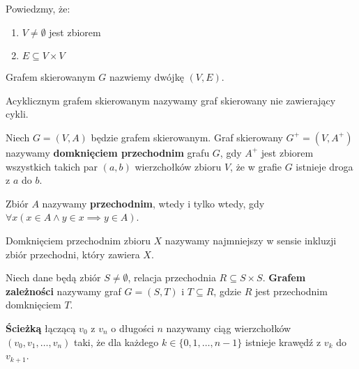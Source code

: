 \begin{definicja}\label{def:DG}
Powiedzmy, że:
\begin{enumerate}
\item \(V\neq\emptyset\) jest zbiorem
\item \( E \subseteq V \times V \)
\end{enumerate}
Grafem skierowanym \(G\) nazwiemy dwójkę \((V, E)\).
\end{definicja}

\begin{definicja}\label{def:dag}
Acyklicznym grafem skierowanym nazywamy graf skierowany nie zawierający cykli.
\end{definicja}

\begin{definicja}\label{def:domk_przechodnie_grafu}
Niech \(G=(V,A)\) będzie grafem skierowanym. Graf skierowany \(G^+=(V,A^{+})\) nazywamy \textbf{domknięciem przechodnim} grafu \(G\), gdy \(A^{+}\) jest zbiorem wszystkich takich par \((a,b)\) wierzchołków zbioru \(V\), że w grafie \(G\) istnieje droga z \(a\) do \(b\).
\end{definicja}

\begin{definicja}\label{def:transitive_set}
Zbiór \(A\) nazywamy \textbf{przechodnim}, wtedy i tylko wtedy, gdy
\(\forall{x}\left(x\in A \land y\in x\implies y\in A\right)\).  
\end{definicja}

\begin{definicja}\label{def:transitive_closure_set}
Domknięciem przechodnim zbioru \(X\) nazywamy najmniejszy w sensie inkluzji zbiór przechodni, który zawiera \(X\).
\end{definicja}

\begin{definicja}\label{def:depend_graph}
Niech dane będą zbiór \(S\neq\emptyset\), relacja przechodnia \(R\subseteq S\times S\). \textbf{Grafem zależności} nazywamy graf \(G=(S,T)\) i \(T\subseteq R\), gdzie \(R\) jest przechodnim domknięciem \(T\).
\end{definicja}


\begin{definicja}[Ścieżka]\label{def:sciezka}
\textbf{Ścieżką} łączącą \(v_0\) z \(v_n\) o długości \(n\) nazywamy ciąg wierzchołków \((v_0, v_1, \dots, v_n)\) taki, że dla każdego \(k\in \{0, 1, \dots, n-1\}\) istnieje krawędź z \(v_k\) do \(v_{k+1}\).
\end{definicja}

